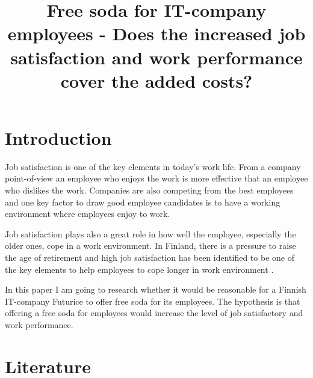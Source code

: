 \documentclass[a4paper]{article}
\begin{document}
\title{\huge Free soda for IT-company employees - Does the increased job satisfaction and work performance cover the added costs?}
\date{\vspace{-5ex}}
\maketitle

\normalsize

\begin{comment}
\title{\huge Free soda for IT-company employees}
\date{2.1.2013}
\author{Mikko Koski \\ mikko.koski@aalto.fi}
\maketitle
\end{comment}

\section{Introduction}

\begin{comment}
Why is this research important? 
Is there a bigger phenomenon that this research of yours is part of? 
Why people in your profession should care about this thesis?
\end{comment}

Job satisfaction is one of the key elements in today's work life. From a company point-of-view an employee who enjoys the work is more effective that an employee who dislikes the work. Companies are also competing from the best employees and one key factor to draw good employee candidates is to have a working environment where employees enjoy to work.

Job satisfaction plays also a great role in how well the employee, especially the older ones, cope in a work environment. In Finland, there is a pressure to raise the age of retirement and high job satisfaction has been identified to be one of the key elements to help employees to cope longer in work environment \citep{ek}.

In this paper I am going to research whether it would be reasonable for a Finnish IT-company Futurice to offer free soda for its employees. The hypothesis is that offering a free soda for employees would increase the level of job satisfactory and work performance. 

\section{Literature}
\end{document}
